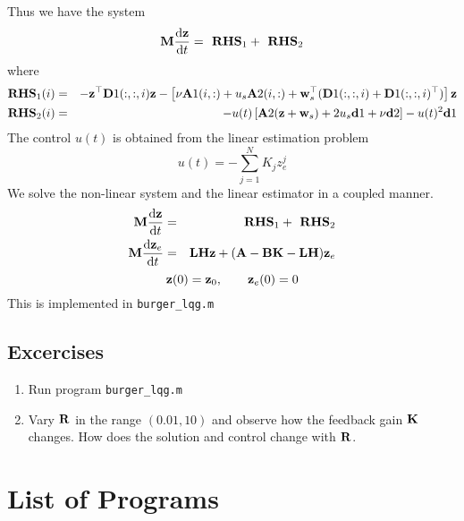 \documentclass[12pt]{article}
\begin{document}
Thus we have the system
\begin{eqnarray*}
 {\mathbf M} \frac{\textrm{d} {\mathbf z}}{\textrm{d} t} = \textbf{ RHS}_1 + \textbf{ RHS}_2 
\end{eqnarray*}
where 
\begin{eqnarray*}
 \textbf{RHS}_1(i) &=& - {\mathbf z}^\top {\mathbf D}1(:,:,i) {\mathbf z} - \left[ \nu {\mathbf A}1(i,:) + u_s {\mathbf A}2(i,:) + {\mathbf w}_s^\top ({\mathbf D}1(:,:,i) + {\mathbf D}1(:,:,i)^\top) \right] {\mathbf z} \\
 \textbf{RHS}_2(i) &=& - u(t) \left[ {\mathbf A}2 ({\mathbf z} + {\mathbf w}_s) + 2 u_s {\mathbf d}1 +\nu {\mathbf d}2 \right] - u(t)^2 {\mathbf d}1 
\end{eqnarray*}
The control $u(t)$ is obtained from the linear estimation problem
\[
 u(t) = - \sum_{j=1}^N K_j z_e^j
\]
We solve the non-linear system and the linear estimator in a coupled manner.
\begin{eqnarray*}
 {\mathbf M} \frac{\textrm{d} {\mathbf z}}{\textrm{d} t} &=& \textbf{ RHS}_1 + \textbf{ RHS}_2\\
 {\mathbf M} \frac{\textrm{d} {\mathbf z}_e}{\textrm{d} t} &=& {\mathbf L} {\mathbf H} {\mathbf z} + ({\mathbf A} - {\mathbf B} {\mathbf K} - {\mathbf L} {\mathbf H}) {\mathbf z}_e
\end{eqnarray*}
\[
{\mathbf z}(0) = {\mathbf z}_0, \qquad {\mathbf z}_e(0) = 0
\]
This is implemented in {\tt burger\_lqg.m}

\subsection{Excercises}

\begin{enumerate}

\item Run program {\tt burger\_lqg.m}

\item Vary ${\mathbf R}$ in the range $(0.01,10)$ and observe how the feedback gain ${\mathbf K}$ changes. How does the solution and control change with ${\mathbf R}$.

\end{enumerate}

\section{List of Programs}
\end{document}
